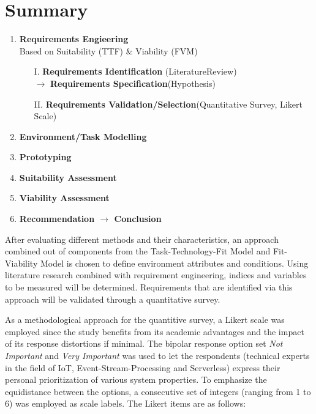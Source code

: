 \section{Summary}

\begin{enumerate}[nolistsep]
        \item \textbf{Requirements Engieering}\\
            Based on Suitability (TTF) \& Viability (FVM)
            \begin{enumerate}
                \item[I.] \textbf{Requirements Identification} (LiteratureReview)\\
                    $\longrightarrow$ \textbf{Requirements Specification}(Hypothesis)
                \item[II.] \textbf{Requirements Validation/Selection}(Quantitative Survey, Likert Scale)
            \end{enumerate}
        \item \textbf{Environment/Task Modelling}
        \item \textbf{Prototyping}
        \item \textbf{Suitability Assessment} 
        \item \textbf{Viability Assessment}
        \item \textbf{Recommendation $\longrightarrow$ Conclusion}
\end{enumerate}

After evaluating different methods and their characteristics, an approach combined out of components from the Task-Technology-Fit Model and Fit-Viability Model is chosen to define environment attributes and conditions. Using literature research combined with requirement engineering, indices and variables to be measured will be determined. Requirements that are identified via this approach will be validated through a quantitative survey. 

As a methodological approach for the quantitive survey, a Likert scale was employed since the study benefits from its academic advantages and the impact of its response distortions if minimal. The bipolar response option set \textit{Not Important} and \textit{Very Important} was used to let the respondents (technical experts in the field of IoT, Event-Stream-Processing and Serverless) express their personal prioritization of various system properties. To emphasize the equidistance between the options, a consecutive set of integers (ranging from 1 to 6) was employed as scale labels. The Likert items are as follows:

